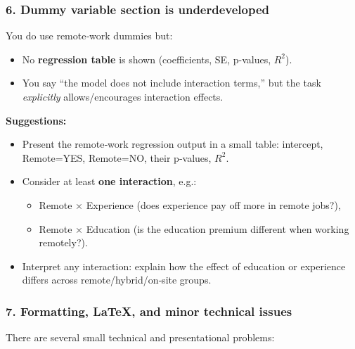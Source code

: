 \documentclass[
  letterpaper,
  DIV=11,
  numbers=noendperiod]{scrartcl}
\providecommand{\tightlist}{%
  \setlength{\itemsep}{0pt}\setlength{\parskip}{0pt}}
\begin{document}
\subsubsection{6. Dummy variable section is
underdeveloped}\label{dummy-variable-section-is-underdeveloped}

You do use remote‑work dummies but:

\begin{itemize}
\tightlist
\item
  No \textbf{regression table} is shown (coefficients, SE, p-values,
  \(R^2\)).\\
\item
  You say ``the model does not include interaction terms,'' but the task
  \emph{explicitly} allows/encourages interaction effects.
\end{itemize}

\textbf{Suggestions:}

\begin{itemize}
\tightlist
\item
  Present the remote‑work regression output in a small table: intercept,
  Remote=YES, Remote=NO, their p‑values, \(R^2\).\\
\item
  Consider at least \textbf{one interaction}, e.g.:

  \begin{itemize}
  \tightlist
  \item
    Remote × Experience (does experience pay off more in remote jobs?),
  \item
    Remote × Education (is the education premium different when working
    remotely?).\\
  \end{itemize}
\item
  Interpret any interaction: explain how the effect of education or
  experience differs across remote/hybrid/on‑site groups.
\end{itemize}

\subsubsection{7. Formatting, LaTeX, and minor technical
issues}\label{formatting-latex-and-minor-technical-issues}

There are several small technical and presentational problems:
\end{document}
